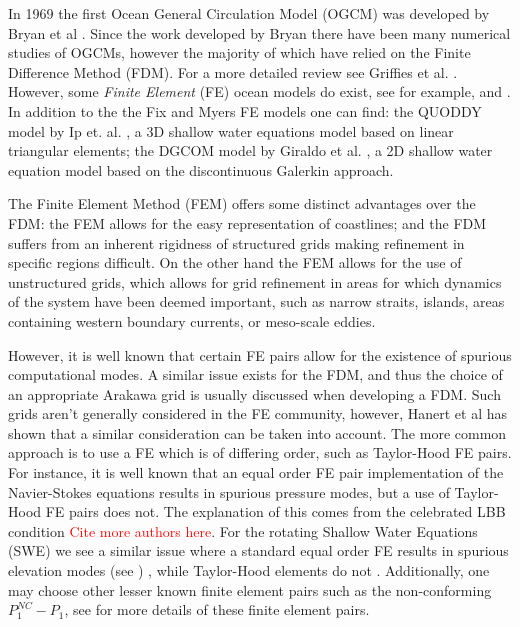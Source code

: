 In 1969 the first Ocean General Circulation Model (OGCM) was developed by Bryan
et al \cite{Bryan1969}. Since the work developed by Bryan there have been many
numerical studies of OGCMs, however the majority of which have relied on the
Finite Difference Method (FDM). For a more detailed review see Griffies et al.
\cite{Griffies2000}. However, some \emph{Finite Element} (FE) ocean models do
exist, see for example, \cite{Fix} and \cite{Myers}. In addition to the the Fix
and Myers FE models one can find: the QUODDY model by Ip et. al.  \cite{Ip1995},
a 3D shallow water equations model based on linear triangular elements; the
DGCOM model by Giraldo et al. \cite{GiraldoWWW}, a 2D shallow water equation
model based on the discontinuous Galerkin approach.

The Finite Element Method (FEM) offers some distinct advantages over the FDM:
the FEM allows for the easy representation of coastlines; and the FDM suffers
from an inherent rigidness of structured grids making refinement in specific
regions difficult. On the other hand the FEM allows for the use of unstructured
grids, which allows for grid refinement in areas for which dynamics of the
system have been deemed important, such as narrow straits, islands, areas
containing western boundary currents, or meso-scale eddies.

However, it is well known that certain FE pairs allow for the existence of
spurious computational modes. A similar issue exists for the FDM, and thus the
choice of an appropriate Arakawa grid is usually discussed when developing a
FDM. Such grids aren't generally considered in the FE community, however, Hanert
et al \cite{Hanert2002} has shown that a similar consideration can be taken into
account. The more common approach is to use a FE which is of differing order,
such as Taylor-Hood FE pairs. For instance, it is well known that an equal order
FE pair implementation of the Navier-Stokes equations results in spurious
pressure modes, but a use of Taylor-Hood FE pairs does not. The explanation of
this comes from the celebrated LBB condition \cite{Johnson2009}
\textcolor{red}{Cite more authors here}. For the rotating Shallow Water
Equations (SWE) we see a similar issue where a standard equal order FE results
in spurious elevation modes (see \cite{Hanert2002,Hanert2006,Le-Roux2005}) ,
while Taylor-Hood elements do not \cite{Hanert2004}. Additionally, one may
choose other lesser known finite element pairs such as the non-conforming
$P_1^{NC}-P_1$, see \cite{Le-Roux1998,Hanert2002,Hanert2005} for more details of
these finite element pairs.

